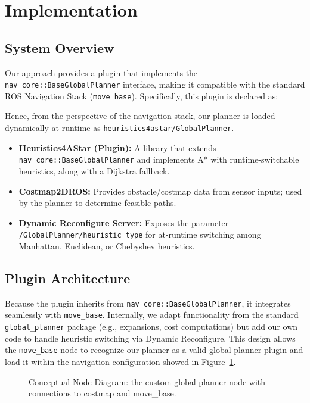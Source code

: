 \documentclass[letterpaper, 10 pt, conference]{ieeeconf}
\begin{document}
\section{Implementation}\label{sec:implementation}

\subsection{System Overview}
Our approach provides a plugin that implements the \texttt{nav\_core::BaseGlobalPlanner} interface, making it compatible with the standard ROS Navigation Stack (\texttt{move\_base}). Specifically, this plugin is declared as:


Hence, from the perspective of the navigation stack, our planner is loaded dynamically at runtime as \texttt{heuristics4astar/GlobalPlanner}.

\begin{itemize}
    \item \textbf{Heuristics4AStar (Plugin):} A library that extends \texttt{nav\_core::BaseGlobalPlanner} and implements A* with runtime-switchable heuristics, along with a Dijkstra fallback.
    \item \textbf{Costmap2DROS:} Provides obstacle/costmap data from sensor inputs; used by the planner to determine feasible paths.
    \item \textbf{Dynamic Reconfigure Server:} Exposes the parameter \texttt{/GlobalPlanner/heuristic\_type} for at-runtime switching among Manhattan, Euclidean, or Chebyshev heuristics.
\end{itemize}

\subsection{Plugin Architecture}
Because the plugin inherits from \texttt{nav\_core::BaseGlobalPlanner}, it integrates seamlessly with \texttt{move\_base}. Internally, we adapt functionality from the standard \texttt{global\_planner} package (e.g., expansions, cost computations) but add our own code to handle heuristic switching via Dynamic Reconfigure. 
This design allows the \texttt{move\_base} node to recognize our planner as a valid global planner plugin and load it within the navigation configuration showed in
Figure~\ref{fig:rqt_graph}.


\begin{figure}[!ht]
    \centering
    \caption{Conceptual Node Diagram: the custom global planner node 
    with connections to costmap and move\_base.}
    \label{fig:rqt_graph}
\end{figure}
\end{document}
